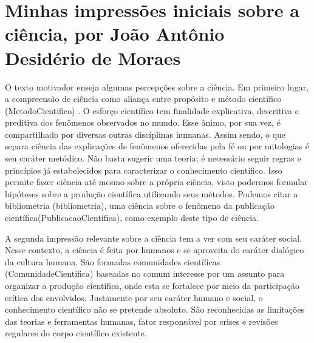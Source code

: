 \section{Minhas impressões iniciais sobre a ciência, por João Antônio Desidério de Moraes}

O texto motivador enseja algumas percepções sobre a ciência. Em primeiro lugar, a compreensão de ciência como aliança entre propósito e método científico (\gls{MetodoCientifico})     . O esforço científico tem finalidade explicativa, descritiva e preditiva dos fenômenos observados no mundo. Esse ânimo, por sua vez, é compartilhado por diversas outras disciplinas humanas. Assim sendo, o que separa ciência das explicações de fenômenos oferecidas pela fé ou por mitologias é seu caráter metódico. Não basta sugerir uma teoria; é necessário seguir regras e princípios já estabelecidos para caracterizar o conhecimento científico. Isso permite fazer ciência até mesmo sobre a própria ciência, visto podermos formular hipóteses sobre a produção científica utilizando seus métodos. Podemos citar a bibliometria (\gls{bibliometria}), uma ciência sobre o fenômeno da publicação científica(\gls{PublicacaoCientifica}), como exemplo deste tipo de ciência.

A segunda impressão relevante sobre a ciência tem a ver com seu caráter social. Nesse contexto, a ciência é feita por humanos e se aproveita do caráter dialógico da cultura humana. São formadas comunidades científicas (\gls{ComunidadeCientifica}) baseadas no comum interesse por um assunto para organizar a produção científica, onde esta se fortalece por meio da participação crítica dos envolvidos. Justamente por seu caráter humano e social, o conhecimento científico não se pretende absoluto. São reconhecidas as limitações das teorias e ferramentas humanas, fator responsável por crises e revisões regulares do corpo científico existente.
